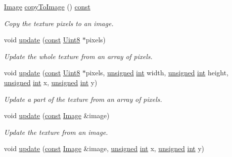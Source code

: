 \begin{DoxyCompactItemize}
\hyperlink{classsf_1_1_image}{Image} \hyperlink{classsf_1_1_texture_aefc19bcd95565dd2348fd4cec0facddc}{copy\-To\-Image} () \hyperlink{term__entry_8h_a57bd63ce7f9a353488880e3de6692d5a}{const} 
\begin{DoxyCompactList}\small\item\em Copy the texture pixels to an image. \end{DoxyCompactList}\item 
void \hyperlink{classsf_1_1_texture_ae4eab5c6781316840b0c50ad08370963}{update} (\hyperlink{term__entry_8h_a57bd63ce7f9a353488880e3de6692d5a}{const} \hyperlink{namespacesf_a4ef3d630785c4f296f9b4f274c33d78e}{Uint8} $\ast$pixels)
\begin{DoxyCompactList}\small\item\em Update the whole texture from an array of pixels. \end{DoxyCompactList}\item 
void \hyperlink{classsf_1_1_texture_a1352d8e16c2aeb4df586ed65dd2c36b9}{update} (\hyperlink{term__entry_8h_a57bd63ce7f9a353488880e3de6692d5a}{const} \hyperlink{namespacesf_a4ef3d630785c4f296f9b4f274c33d78e}{Uint8} $\ast$pixels, \hyperlink{curses_8priv_8h_aca40206900cfc164654362fa8d4ad1e6}{unsigned} \hyperlink{term__entry_8h_ad65b480f8c8270356b45a9890f6499ae}{int} width, \hyperlink{curses_8priv_8h_aca40206900cfc164654362fa8d4ad1e6}{unsigned} \hyperlink{term__entry_8h_ad65b480f8c8270356b45a9890f6499ae}{int} height, \hyperlink{curses_8priv_8h_aca40206900cfc164654362fa8d4ad1e6}{unsigned} \hyperlink{term__entry_8h_ad65b480f8c8270356b45a9890f6499ae}{int} x, \hyperlink{curses_8priv_8h_aca40206900cfc164654362fa8d4ad1e6}{unsigned} \hyperlink{term__entry_8h_ad65b480f8c8270356b45a9890f6499ae}{int} y)
\begin{DoxyCompactList}\small\item\em Update a part of the texture from an array of pixels. \end{DoxyCompactList}\item 
void \hyperlink{classsf_1_1_texture_a037cdf171af0fb392d07626a44a4ea17}{update} (\hyperlink{term__entry_8h_a57bd63ce7f9a353488880e3de6692d5a}{const} \hyperlink{classsf_1_1_image}{Image} \&image)
\begin{DoxyCompactList}\small\item\em Update the texture from an image. \end{DoxyCompactList}\item 
void \hyperlink{classsf_1_1_texture_a87f916490b757fe900798eedf3abf3ba}{update} (\hyperlink{term__entry_8h_a57bd63ce7f9a353488880e3de6692d5a}{const} \hyperlink{classsf_1_1_image}{Image} \&image, \hyperlink{curses_8priv_8h_aca40206900cfc164654362fa8d4ad1e6}{unsigned} \hyperlink{term__entry_8h_ad65b480f8c8270356b45a9890f6499ae}{int} x, \hyperlink{curses_8priv_8h_aca40206900cfc164654362fa8d4ad1e6}{unsigned} \hyperlink{term__entry_8h_ad65b480f8c8270356b45a9890f6499ae}{int} y)

\end{DoxyCompactItemize}
